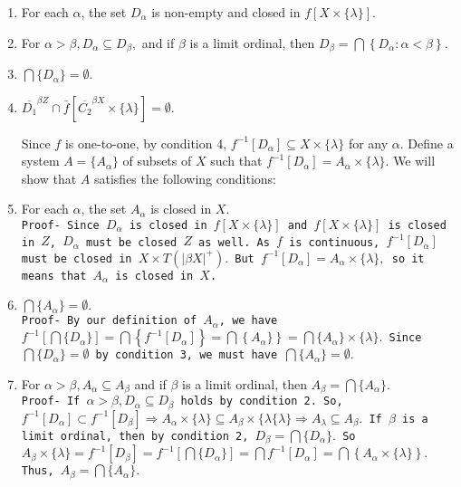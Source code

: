 \documentclass{article}
\begin{document}
\begin{enumerate}
	\item For each $\alpha$, the set $D_\alpha$ is non-empty and closed in $f\left[X\times \{\lambda\}\right].$
	\item For $\alpha>\beta, D_\alpha\subseteq D_\beta,$ and if $\beta$ is a limit ordinal, then $D_\beta=\bigcap\left\{ D_\alpha: \alpha< \beta\right\}$.
	\item $\bigcap \{D_\alpha\}=\emptyset$.
	\item $\overline{D_1}^{\beta Z} \cap \bar{f}\left[\overline{C_2}^{\beta X} \times \{\lambda\}\right]=\emptyset.$

\vskip 20pt

\begin{flushleft}
Since $f$ is one-to-one, by condition 4, $f^{-1}\left[D_\alpha\right]\subseteq X\times\{\lambda\}$ for any $\alpha$. Define a system $A=\{A_\alpha\}$ of subsets of $X$ such that $f^{-1}\left[D_\alpha\right]=A_\alpha\times\{\lambda\}.$ We will show that $A$ satisfies the following conditions: 
\end{flushleft}

\vskip 20pt


	\item For each $\alpha$, the set $A_\alpha$ is closed in $X$.\\
	\texttt{Proof- Since $D_\alpha$ is closed in $f\left[X\times\{\lambda\}\right]$ and $f\left[X\times\{\lambda\}\right]$ is closed in $Z$, $D_\alpha$ must be closed $Z$ as well. As $f$ is continuous, $f^{-1}\left[D_\alpha\right]$ must be closed in $X\times T(|\beta X|^+).$ But $f^{-1}\left[D_\alpha\right]=A_\alpha \times \{\lambda\},$ so it means that $A_\alpha$ is closed in $X$. \
	}
	
\vskip 20pt	
	
	
	\item $\bigcap\{A_\alpha\}=\emptyset.$\\
	\texttt{Proof- By our definition of $A_\alpha$, we have $f^{-1}\left[\bigcap\{D_\alpha\}\right]=\bigcap\left\{f^{-1}\left[D_\alpha\right]\right\}=
	\bigcap\left\{A_\alpha\}\right\}=\bigcap \{A_\alpha\}\times\{\lambda\}.$ Since $\bigcap \{D_\alpha\}=\emptyset $ by condition 3, we must have $\bigcap \{A_\alpha\}= \emptyset.$
	}
	
\vskip 20pt	
	
	\item For $\alpha>\beta, A_\alpha \subseteq A_\beta$ and if $\beta$ is a limit ordinal, then $A_\beta=\bigcap\{A_\alpha\}.$\\
	\texttt{Proof- If $\alpha>\beta, D_\alpha\subseteq D_\beta$ holds by condition 2. So, $f^{-1}\left[D_\alpha\right]\subset f^{-1}\left[D_\beta\right] \Rightarrow A_\alpha\times \{\lambda\} \subseteq A_\beta\times \{\lambda \{\lambda\} \Rightarrow A_\lambda \subseteq A_\beta.$ If $\beta$ is a limit ordinal, then by condition 2, $D_\beta=\bigcap \{D_\alpha\}.$ So $A_\beta\times\{\lambda\}=f^{-1}\left[D_\beta\right]=f^{-1}\left[\bigcap\{D_\alpha\}\right]=\bigcap f^{-1}\left[D_\alpha\right]=\bigcap \left\{A_\alpha\times \{\lambda\}\right\}.$ Thus, $A_\beta=\bigcap \{A_\alpha\}.$
	}
	


\end{enumerate}
\end{document}
